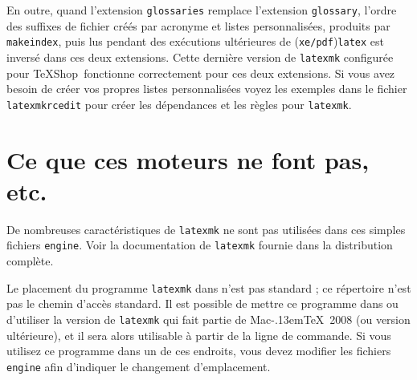 \documentclass[11pt,french]{article}
\newcommand{\MacTeX}{Mac\kern-.13em\TeX}
\newcommand{\TS}{\textsf{\TeX Shop}}
\begin{document}
En outre, quand l'extension \texttt{glossaries} remplace l'extension \texttt{glossary}, l'ordre des suffixes de fichier créés par acronyme et listes personnalisées, produits par \texttt{makeindex}, puis lus pendant des exécutions ultérieures de (\texttt{xe/pdf})\texttt{latex} est inversé dans ces deux extensions. Cette dernière version de \texttt{latexmk} configurée pour \TS\ fonctionne correctement pour ces deux extensions. Si vous avez besoin de créer vos propres listes personnalisées voyez les exemples dans le fichier \texttt{latexmkrcedit} pour créer les dépendances et les règles pour \texttt{latexmk}.

%
%
%
%

\section{Ce que ces moteurs ne font pas, etc.}

De nombreuses caractéristiques de \texttt{latexmk} ne sont pas utilisées dans ces simples fichiers \texttt{engine}. Voir la documentation de \texttt{latexmk} fournie dans la distribution complète.

Le placement du programme \texttt{latexmk} dans  n'est pas standard ; ce répertoire n'est pas le chemin d'accès standard. Il est possible de mettre ce programme dans  ou d'utiliser la version de \texttt{latexmk} qui fait partie de \MacTeX\ 2008 (ou version ultérieure), et il sera alors utilisable à partir de la ligne de commande. Si vous utilisez ce programme dans un de ces endroits, vous devez modifier les fichiers \texttt{engine} afin d'indiquer le changement d'emplacement.
\end{document}
